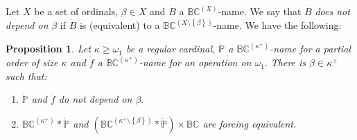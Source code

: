 \documentclass{article}
\newtheorem{proposition}[theorem]{Proposition}
\begin{document}
\qquad\qquad\qquad

Let $X$ be a set of ordinals, $\beta\in X$ and $\dot{B}$ a $\mathbb{BC}%
^{\left(  X\right)  }$-name$.$ We say that $\dot{B}$ \emph{does not depend on
}$\beta$ if $\dot{B}$ is (equivalent) to a $\mathbb{BC}^{\left(
X\setminus\left\{  \beta\right\}  \right)  }$-name. We have the following:

\begin{proposition}
Let $\kappa\geq\omega_{1}$ be a regular cardinal, $\mathbb{\dot{P}}$ a
$\mathbb{BC}^{\left(  \kappa^{+}\right)  }$-name for a partial order of size
$\kappa$ and $\dot{f}$ a $\mathbb{BC}^{\left(  \kappa^{+}\right)  }$-name for
an operation on $\omega_{1}.$ There is $\beta\in\kappa^{+}$ such that:
\label{Prop no depende}

\begin{enumerate}
\item $\mathbb{\dot{P}}$ and $\dot{f}$ do not depend on $\beta.$

\item $\mathbb{BC}^{\left(  \kappa^{+}\right)  }\ast\mathbb{\dot{P}}$ and
$(\mathbb{BC}^{(\kappa^{+}\setminus\left\{  \beta\right\}  )}\ast
\mathbb{\dot{P}})\times\mathbb{BC}$ are forcing equivalent.
\end{enumerate}
\end{proposition}
\end{document}
